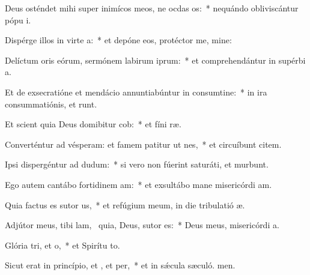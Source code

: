 \item Deus osténdet mihi super inimícos meos, ne ocdas os:~* nequándo obliviscántur pópu i.
\item Dispérge illos in virte a:~* et depóne eos, protéctor me, mine:
\item Delíctum oris eórum, sermónem labirum iprum:~* et comprehendántur in supérbi a.
\item Et de exsecratióne et mendácio annuntiabúntur in consumtine:~* in ira consummatiónis, et  runt.
\item Et scient quia Deus domibitur cob:~* et fíni ræ.
\item Converténtur ad vésperam: et famem patitur ut nes,~* et circuíbunt citem.
\item Ipsi dispergéntur ad dudum:~* si vero non fúerint saturáti, et murbunt.
\item Ego autem cantábo fortidinem am:~* et exsultábo mane misericórdi am.
\item Quia factus es sutor us,~* et refúgium meum, in die tribulatió æ.
\item Adjútor meus, tibi lam,~\pscross{} quia, Deus, sutor  es:~* Deus meus, misericórdi a.
\item Glória tri, et o,~* et Spirítu to.
\item Sicut erat in princípio, et , et per,~* et in sǽcula sæculó. men.
